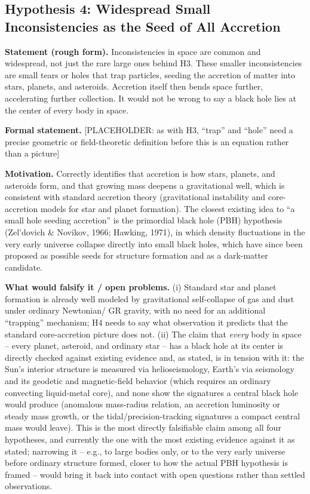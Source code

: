 \documentclass[12pt, a4paper]{article}
\begin{document}
\subsection{Hypothesis 4: Widespread Small Inconsistencies as the Seed of All Accretion}
\label{subsec:h4}
\textbf{Statement (rough form).} Inconsistencies in space are common
and widespread, not just the rare large ones behind H3. These smaller
inconsistencies are small tears or holes that trap particles, seeding
the accretion of matter into stars, planets, and asteroids. Accretion
itself then bends space further, accelerating further collection.
It would not be wrong to say a black hole lies at the center of every
body in space.

\textbf{Formal statement.}
[PLACEHOLDER: as with H3, ``trap'' and ``hole'' need a precise
geometric or field-theoretic definition before this is an equation
rather than a picture]

\textbf{Motivation.} Correctly identifies that accretion is how stars,
planets, and asteroids form, and that growing mass deepens a
gravitational well, which is consistent with standard accretion
theory (gravitational instability and core-accretion models for star
and planet formation). The closest existing idea to ``a small hole
seeding accretion'' is the primordial black hole (PBH) hypothesis
(Zel'dovich \& Novikov, 1966; Hawking, 1971), in which density
fluctuations in the very early universe collapse directly into small
black holes, which have since been proposed as possible seeds for
structure formation and as a dark-matter candidate.

\textbf{What would falsify it / open problems.}
(i) Standard star and planet formation is already well modeled by
gravitational self-collapse of gas and dust under ordinary Newtonian/
GR gravity, with no need for an additional ``trapping'' mechanism; H4
needs to say what observation it predicts that the standard
core-accretion picture does not. (ii) The claim that \emph{every} body
in space -- every planet, asteroid, and ordinary star -- has a black
hole at its center is directly checked against existing evidence and,
as stated, is in tension with it: the Sun's interior structure is
measured via helioseismology, Earth's via seismology and its geodetic
and magnetic-field behavior (which requires an ordinary convecting
liquid-metal core), and none show the signatures a central black hole
would produce (anomalous mass-radius relation, an accretion luminosity
or steady mass growth, or the tidal/precision-tracking signatures a
compact central mass would leave). This is the most directly
falsifiable claim among all four hypotheses, and currently the one
with the most existing evidence against it as stated; narrowing it --
e.g., to large bodies only, or to the very early universe before
ordinary structure formed, closer to how the actual PBH hypothesis is
framed -- would bring it back into contact with open questions rather
than settled observations.
\end{document}
